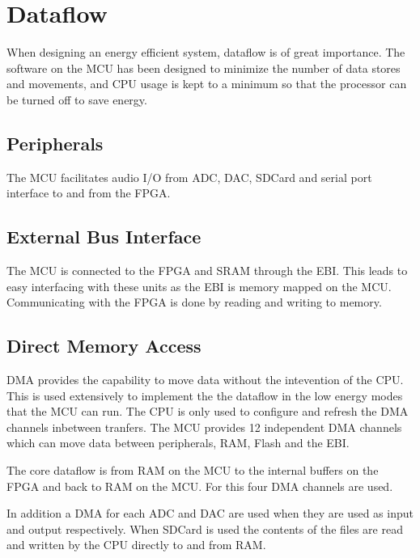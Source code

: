 
\section{Dataflow}

When designing an energy efficient system, dataflow is of great importance. The software 
on the MCU has been designed to minimize the number of data stores and movements, and CPU
usage is kept to a minimum so that the processor can be turned off to save energy.

\subsection{Peripherals}
The MCU facilitates audio I/O from ADC, DAC, SDCard and serial port interface to and from 
the FPGA. 


\subsection{External Bus Interface}
The MCU is connected to the FPGA and SRAM through the EBI. This leads to easy interfacing 
with these units as the EBI is memory mapped on the MCU. Communicating with the FPGA is 
done by reading and writing to memory. 


\subsection{Direct Memory Access}
DMA provides the capability to move data without the intevention of the CPU. 
This is used extensively to implement the the dataflow in the low energy modes
that the MCU can run. The CPU is only used to configure and refresh the DMA 
channels inbetween tranfers. The MCU provides 12 independent DMA channels which can
move data between peripherals, RAM, Flash and the EBI. 

The core dataflow is from RAM on the MCU to the internal buffers on the FPGA 
and back to RAM on the MCU. For this four DMA channels are used.

In addition a DMA for each ADC and DAC are used when they are used as input and 
output respectively. When SDCard is used the contents of the files are read and
written by the CPU directly to and from RAM. 

